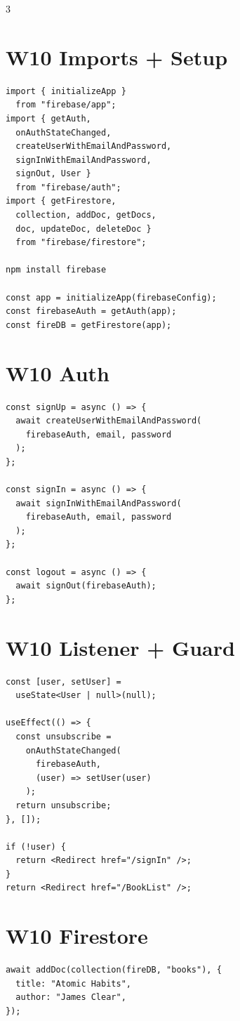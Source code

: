 \documentclass[8pt,letterpaper]{extarticle}
\begin{document}
\begin{multicols}{3}
\section*{W10 Imports + Setup}
\begin{lstlisting}
import { initializeApp }
  from "firebase/app";
import { getAuth,
  onAuthStateChanged,
  createUserWithEmailAndPassword,
  signInWithEmailAndPassword,
  signOut, User }
  from "firebase/auth";
import { getFirestore,
  collection, addDoc, getDocs,
  doc, updateDoc, deleteDoc }
  from "firebase/firestore";

npm install firebase

const app = initializeApp(firebaseConfig);
const firebaseAuth = getAuth(app);
const fireDB = getFirestore(app);
\end{lstlisting}

\section*{W10 Auth}
\begin{lstlisting}
const signUp = async () => {
  await createUserWithEmailAndPassword(
    firebaseAuth, email, password
  );
};

const signIn = async () => {
  await signInWithEmailAndPassword(
    firebaseAuth, email, password
  );
};

const logout = async () => {
  await signOut(firebaseAuth);
};
\end{lstlisting}

\section*{W10 Listener + Guard}
\begin{lstlisting}
const [user, setUser] =
  useState<User | null>(null);

useEffect(() => {
  const unsubscribe =
    onAuthStateChanged(
      firebaseAuth,
      (user) => setUser(user)
    );
  return unsubscribe;
}, []);

if (!user) {
  return <Redirect href="/signIn" />;
}
return <Redirect href="/BookList" />;
\end{lstlisting}

\section*{W10 Firestore}
\begin{lstlisting}
await addDoc(collection(fireDB, "books"), {
  title: "Atomic Habits",
  author: "James Clear",
});


\end{lstlisting}
\end{multicols}
\end{document}
